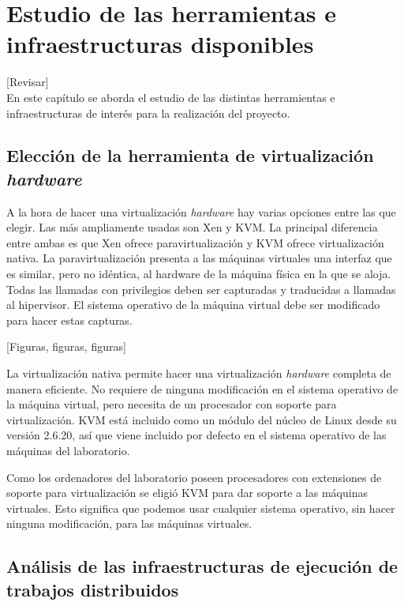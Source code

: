 \chapter{Estudio de las herramientas e infraestructuras disponibles}
\label{cap:estudio}

[Revisar]\\

En este capítulo se aborda el estudio de las distintas herramientas e infraestructuras de interés para la realización del proyecto.


\section{Elección de la herramienta de virtualización \emph{hardware}}

A la hora de hacer una virtualización \emph{hardware} hay varias opciones entre las que elegir. Las más ampliamente usadas son Xen y KVM. La principal diferencia entre ambas es que Xen ofrece paravirtualización y KVM ofrece virtualización nativa.
La paravirtualización presenta a las máquinas virtuales una interfaz que es similar, pero no idéntica, al hardware de la máquina física en la que se aloja. Todas las llamadas con privilegios deben ser capturadas y traducidas a llamadas al hipervisor. El sistema operativo de la máquina virtual debe ser modificado para hacer estas capturas.

[Figuras, figuras, figuras]

La virtualización nativa permite hacer una virtualización \emph{hardware} completa de manera eficiente. No requiere de ninguna modificación en el sistema operativo de la máquina virtual, pero necesita de un procesador con soporte para virtualización. KVM está incluido como un módulo del núcleo de Linux desde su versión 2.6.20, así que viene incluido por defecto en el sistema operativo de las máquinas del laboratorio.

Como los ordenadores del laboratorio poseen procesadores con extensiones de soporte para virtualización se eligió KVM para dar soporte a las máquinas virtuales. Esto significa que podemos usar cualquier sistema operativo, sin hacer ninguna modificación, para las máquinas virtuales.


\section{Análisis de las infraestructuras de ejecución de trabajos distribuidos}

